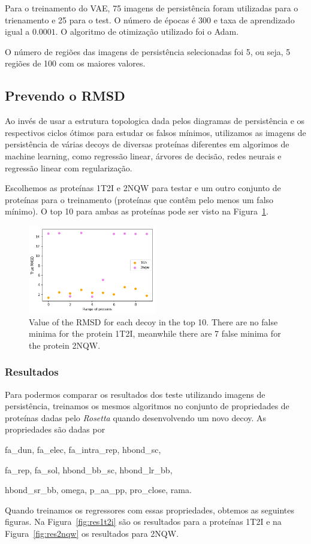 Para o treinamento do VAE, 75 imagens de persistência foram utilizadas para o trienamento e 25 para o test. O
número de épocas é 300 e taxa de aprendizado igual a $0.0001$. O algoritmo de otimização utilizado foi o Adam.

O número de regiões das imagens de persistência selecionadas foi 5, ou seja, 5 regiões de 100 com
os maiores valores.

\subsection{Prevendo o RMSD}

Ao invés de usar a estrutura topologica dada pelos diagramas de persistência e os respectivos ciclos ótimos para
estudar os falsos mínimos, utilizamos as imagens de persistência de várias decoys de diversas proteínas diferentes
em algorimos de machine learning, como regressão linear, árvores de decisão, redes neurais e regressão linear
com regularização.

Escolhemos as proteínas 1T2I e 2NQW para testar e um outro conjunto de proteínas para o treinamento (proteínas
que contêm pelo menos um falso mínimo). O top 10 para ambas as proteínas pode ser visto na Figura~\ref{fig:truermsd}.

\begin{figure}[!htbp]
    \centering
    \includegraphics[width=0.5\textwidth]{images/relatorio/true_rmsd.png}
    \caption{Value of the RMSD for each decoy in the top 10. There are no false minima for the protein 1T2I,
            meanwhile there are 7 false minima for the protein 2NQW.}
    \label{fig:truermsd}
\end{figure}

\subsubsection{Resultados}

Para podermos comparar os resultados dos teste utilizando imagens de persistência, 
treinamos os mesmos algoritmos no conjunto de propriedades de proteínas dadas pelo \textit{Rosetta} 
quando desenvolvendo um novo decoy. As propriedades são dadas por
\begin{center}
    fa\_dun, fa\_elec, fa\_intra\_rep, hbond\_sc,

    fa\_rep, fa\_sol, hbond\_bb\_sc, hbond\_lr\_bb,

    hbond\_sr\_bb, omega, p\_aa\_pp, pro\_close, rama.
\end{center}
Quando treinamos os regressores com essas propriedades, obtemos as seguintes figuras. 
Na Figura~\ref{fig:res1t2i} são os resultados para a proteínas 1T2I e na Figura~\ref{fig:res2nqw} 
os resultados para 2NQW.

